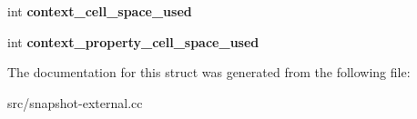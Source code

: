 \begin{DoxyCompactItemize}
\item 
\hypertarget{structv8_1_1internal_1_1_snapshot_impl_addac9ecf7747d1c02fc6d90180368fd4}{}int {\bfseries context\+\_\+cell\+\_\+space\+\_\+used}\label{structv8_1_1internal_1_1_snapshot_impl_addac9ecf7747d1c02fc6d90180368fd4}

\item 
\hypertarget{structv8_1_1internal_1_1_snapshot_impl_aab741b3c93cac22f03b597ab813b4964}{}int {\bfseries context\+\_\+property\+\_\+cell\+\_\+space\+\_\+used}\label{structv8_1_1internal_1_1_snapshot_impl_aab741b3c93cac22f03b597ab813b4964}

\end{DoxyCompactItemize}


The documentation for this struct was generated from the following file\+:\begin{DoxyCompactItemize}
\item 
src/snapshot-\/external.\+cc\end{DoxyCompactItemize}
